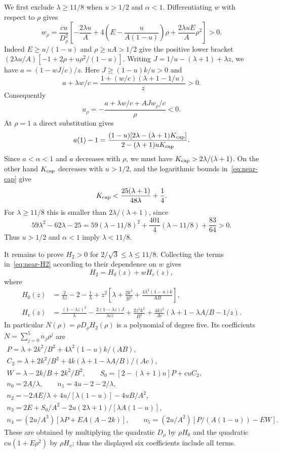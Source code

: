 We first exclude $\lambda\ge11/8$ when $u>1/2$ and $\alpha<1$. Differentiating $w$ with respect to $\rho$ gives
\[
 w_\rho=\frac{cu}{D_\rho^2}
 \left[-\frac{2\lambda u}{A}+4\left(E-\frac{u}{A(1-u)}\right)\rho
                      +\frac{2\lambda uE}{A}\rho^2\right]>0.
\]
Indeed $E\ge u/(1-u)$ and $\rho\ge uA>1/2$ give the positive lower bracket
$(2\lambda u/A)[-1+2\rho+u\rho^2/(1-u)]$.
Writing $J=1/u-(\lambda+1)+\lambda z$, we have $a=(1-wJ/c)/z$. Here $J\ge(1-u)k/u>0$ and
\[
 a+\lambda w/c=\frac{1+(w/c)(\lambda+1-1/u)}z>0.
\]
Consequently
\[
 a_\rho=-\frac{a+\lambda w/c+AJw_\rho/c}{\rho}<0.
\]
At $\rho=1$ a direct substitution gives
\[
 a(1)-1=\frac{(1-u)[2\lambda-(\lambda+1)K_{\rm cap}]}
                     {2-(\lambda+1)uK_{\rm cap}}.
\]
Since $a<\alpha<1$ and $a$ decreases with $\rho$, we must have
$K_{\rm cap}>2\lambda/(\lambda+1)$. On the other hand $K_{\rm cap}$ decreases with $u>1/2$, and the logarithmic bounds in~\eqref{eq:near-cap} give
\[
 K_{\rm cap}<\frac{25(\lambda+1)}{48\lambda}+\frac14.
\]
For $\lambda\ge11/8$ this is smaller than $2\lambda/(\lambda+1)$, since
\[
 59\lambda^2-62\lambda-25
 =59(\lambda-11/8)^2+\frac{401}{4}(\lambda-11/8)+\frac{83}{64}>0.
\]
Thus $u>1/2$ and $\alpha<1$ imply $\lambda<11/8$.

It remains to prove $H_2>0$ for $2/\sqrt3\le\lambda\le11/8$. Collecting the terms in~\eqref{eq:near-H2} according to their dependence on $w$ gives
\[
 H_2=H_0(z)+wH_v(z),
\]
where
\begin{equation}\label{eq:near-H0-Hv}
\begin{split}
 H_0(z)&=\frac2{\lambda z}-2-\frac1\lambda
       +z^2\left[\lambda+\frac{2k^2}{B^2}
                       +\frac{4\lambda^2(1-u)k}{AB}\right],\\
 H_v(z)&=\frac{(1-\lambda z)^2}{\lambda}
  -\frac{2(1-\lambda z)J}{\lambda cz}+\frac{2z^2k^2}{B^2}
  +\frac{4kz^2}{Ac}(\lambda+1-\lambda A/B-1/z).
\end{split}
\end{equation}
In particular $N(\rho)=\rho D_\rho H_2(\rho)$ is a polynomial of degree five. Its coefficients $N=\sum_{j=0}^5n_j\rho^j$ are
\begin{equation}\label{eq:near-N-coefficients}
\begin{gathered}
 P=\lambda+2k^2/B^2+4\lambda^2(1-u)k/(AB),\\
 C_2=\lambda+2k^2/B^2+4k(\lambda+1-\lambda A/B)/(Ac),\\
 W=\lambda-2k/B+2k^2/B^2,\qquad
 S_0=[2-(\lambda+1)u]P+cuC_2,\\
 n_0=2A/\lambda,\qquad n_1=4u-2-2/\lambda,\\
 n_2=-2AE/\lambda+4u/[\lambda(1-u)]-4uB/A^2,\\
 n_3=2E+S_0/A^2-2u(2\lambda+1)/[\lambda A(1-u)],\\
 n_4=(2u/A^3)[\lambda P+EA(A-2k)],\qquad
 n_5=(2u/A^2)[P/(A(1-u))-EW].
\end{gathered}
\end{equation}
These are obtained by multiplying the quadratic $D_\rho$ by $\rho H_0$ and the quadratic $cu(1+E\rho^2)$ by $\rho H_v$; thus the displayed six coefficients include all terms.

